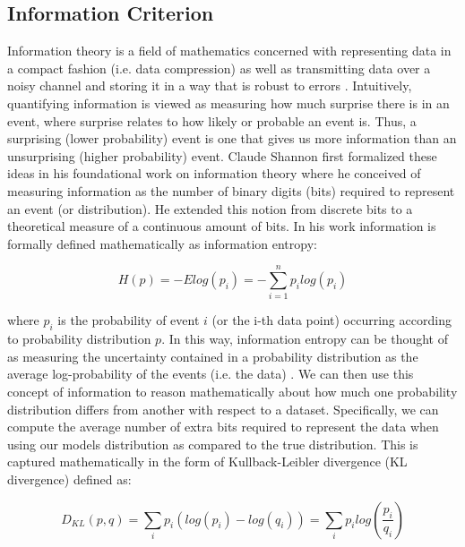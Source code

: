 \subsection*{Information Criterion}

Information theory is a field of mathematics concerned with representing data in a compact fashion (i.e. data compression) as well as transmitting data over a noisy channel and storing it in a way that is robust to errors \cite{Murphy2012}. Intuitively, quantifying information is viewed as measuring how much surprise there is in an event, where surprise relates to how likely or probable an event is. Thus, a surprising (lower probability) event is one that gives us more information than an unsurprising (higher probability) event. Claude Shannon first formalized these ideas in his foundational work on information theory \cite{Shannon1948} where he conceived of measuring information as the number of binary digits (bits) required to represent an event (or distribution). He extended this notion from discrete bits to a theoretical measure of a continuous amount of bits. In his work information is formally defined mathematically as information entropy:

\begin{equation}
H(p) = -Elog(p_i) = - \sum_{i=1}^{n} p_i log(p_i)
\end{equation}

where $p_i$ is the probability of event $i$ (or the i-th data point) occurring according to probability distribution $p$. In this way, information entropy can be thought of as measuring the uncertainty contained in a probability distribution as the average log-probability of the events (i.e. the data) \cite{McElreath2020}. We can then use this concept of information to reason mathematically about how much one probability distribution differs from another with respect to a dataset. Specifically, we can compute the average number of extra bits required to represent the data when using our models distribution as compared to the true distribution. This is captured mathematically in the form of Kullback-Leibler divergence (KL divergence) defined as:

\begin{equation}
D_{KL}(p,q) = \sum_{i} p_i (log(p_i) - log(q_i)) = \sum_{i} p_i log \left(\frac{p_i}{q_i} \right)
\end{equation}

